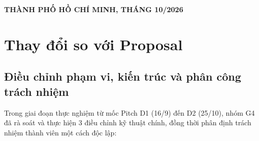 \documentclass[10pt,a4paper]{article}
\begin{document}
\begin{titlepage}
\begin{center}
  \vfill

  {\fontsize{9pt}{11pt}\bfseries THÀNH PHỐ HỒ CHÍ MINH, THÁNG 10/2026}
  \vspace*{-10mm}
\end{center}
\end{titlepage}

\newpage
\setcounter{page}{1}

\section{Thay đổi so với Proposal}

\subsection{Điều chỉnh phạm vi, kiến trúc và phân công trách nhiệm}
Trong giai đoạn thực nghiệm từ mốc Pitch D1 (16/9) đến D2 (25/10), nhóm G4 đã rà soát và thực hiện 3 điều chỉnh kỹ thuật chính, đồng thời phân định trách nhiệm thành viên một cách độc lập:
\end{document}
